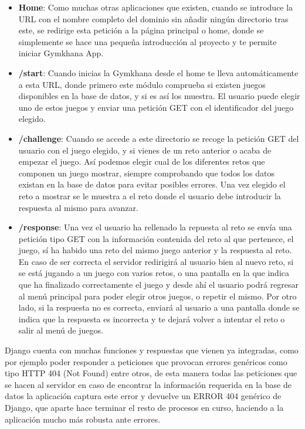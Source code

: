 \documentclass[a4paper, 12pt]{book}
\begin{document}
\begin{itemize}
	\item \textbf {Home}: Como muchas otras aplicaciones que existen, cuando se introduce la URL con el nombre completo del dominio sin añadir ningún directorio tras este, se redirige esta petición a la página principal o home, donde se simplemente se hace una pequeña introducción al proyecto y te permite iniciar Gymkhana App. 
	\item \textbf {/start}: Cuando inicias la Gymkhana desde el home te lleva automáticamente a esta URL, donde primero este módulo comprueba si existen juegos disponibles en la base de datos, y si es así los muestra. El usuario puede elegir uno de estos juegos y enviar una petición GET con el identificador del juego elegido. 
	\item \textbf {/challenge}: Cuando se accede a este directorio se recoge la petición GET del usuario con el juego elegido, y si vienes de un reto anterior o acaba de empezar el juego. Así podemos elegir cual de los diferentes retos que componen un juego mostrar, siempre comprobando que todos los datos existan en la base de datos para evitar posibles errores. Una vez elegido el reto a mostrar se le muestra a el reto donde el usuario debe introducir la respuesta al mismo para avanzar. 
	\item \textbf {/response}: Una vez el usuario ha rellenado la repuesta al reto se envía una petición tipo GET con la información contenida del reto al que pertenece, el juego, sí ha habido una reto del mismo juego anterior y la respuesta al reto. En caso de ser correcta el servidor redirigirá al usuario bien al nuevo reto, si se está jugando a un juego con varios retos, o una pantalla en la que indica que ha finalizado correctamente el juego y desde ahí el usuario podrá regresar al menú principal para poder elegir otros juegos, o repetir el mismo. Por otro lado, si la respuesta no es correcta, enviará al usuario a una pantalla donde se indica que la respuesta es incorrecta y te dejará volver a intentar el reto o salir al menú de juegos.
\end{itemize}

Django cuenta con muchas funciones y respuestas que vienen ya integradas, como por ejemplo poder responder a peticiones que provocan errores genéricos como tipo HTTP 404 (Not Found) entre otros, de esta manera todas las peticiones que se hacen al servidor en caso de encontrar la información requerida en la base de datos la aplicación captura este error y devuelve un ERROR 404 genérico de Django, que aparte hace terminar el resto de procesos en curso, haciendo a la aplicación mucho más robusta ante errores. 
\end{document}

